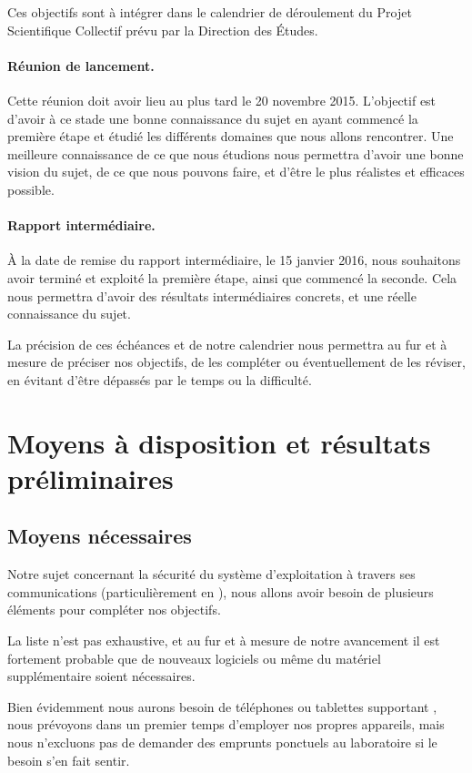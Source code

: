 \documentclass[a4paper, 12pt,twoside]{article}
\begin{document}
		Ces objectifs sont à intégrer dans le calendrier de déroulement du  Projet Scientifique Collectif prévu par la Direction des Études.
		
		\paragraph{Réunion de lancement. } Cette réunion doit avoir lieu au plus tard le 20 novembre 2015. L'objectif est d'avoir à ce stade une bonne connaissance du sujet en ayant commencé la première étape et étudié les différents domaines que nous allons rencontrer. Une meilleure connaissance de ce que nous étudions nous permettra d'avoir une bonne vision du sujet, de ce que nous pouvons faire, et d'être le plus réalistes et efficaces possible.
		
		\paragraph{Rapport intermédiaire. } À la date de remise du rapport intermédiaire, le 15 janvier 2016, nous souhaitons avoir terminé et exploité la première étape, ainsi que commencé la seconde. Cela nous permettra d'avoir des résultats intermédiaires concrets, et une réelle connaissance du sujet.
		
		La précision de ces échéances et de notre calendrier nous permettra au fur et à mesure de préciser nos objectifs, de les compléter ou éventuellement de les réviser, en évitant d'être dépassés par le temps ou la difficulté.
			
	\section{Moyens à disposition et résultats préliminaires}
	
		\subsection{Moyens nécessaires}

		Notre sujet concernant la sécurité du système d'exploitation \Android{} à travers ses communications (particulièrement en \wifi{}), nous allons avoir besoin de plusieurs éléments pour compléter nos objectifs.
		
		La liste n'est pas exhaustive, et au fur et à mesure de notre avancement il est fortement probable que de nouveaux logiciels ou même du matériel supplémentaire soient nécessaires.
		
		Bien évidemment nous aurons besoin de téléphones ou tablettes supportant \Android{}, nous prévoyons dans un premier temps d'employer nos propres appareils, mais nous n'excluons pas de demander des emprunts ponctuels au laboratoire si le besoin s'en fait sentir.
		
\end{document}
